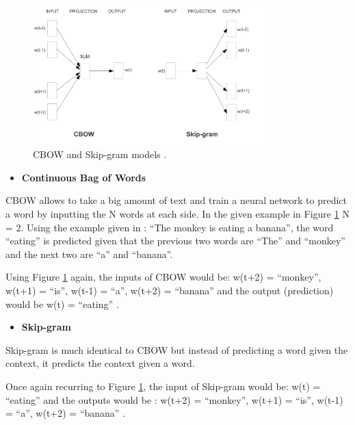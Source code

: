         \begin{figure}[H]
            \centering
            \captionsetup{justification=centering}
            \includegraphics[width=0.8\textwidth]{Sections/3StateOfTheArt/3_images/Cbow_Skip.png}
            \caption[CBOW and Skip-gram models]{CBOW and Skip-gram models \cite{Mikolov2013}.} 
            \label{fig:cbow_skip}
        \end{figure}



        \begin{itemize}
            \item \textbf{Continuous Bag of Words}
        \end{itemize}


       CBOW allows to take a big amount of text and train a neural network to predict a word by inputting the N words at each side. In the given example in Figure \ref{fig:cbow_skip}  N = 2. Using the example given in \cite{Mordecki2017} : “The monkey is eating a banana”, the word “eating” is predicted given that the previous two words are “The” and “monkey” and the next two are “a” and “banana”.

        Using Figure \ref{fig:cbow_skip} again, the inputs of CBOW would be: w(t+2) = “monkey”, w(t+1) = “is”, w(t-1) = “a”, w(t+2) = “banana” and the output (prediction) would be w(t) = “eating” \cite{Mordecki2017}.
        
        
        \begin{itemize}
            \item \textbf{Skip-gram}
        \end{itemize}

        Skip-gram is much identical to CBOW but instead of predicting a word given the context, it predicts the context given a word. 

        Once again recurring to Figure \ref{fig:cbow_skip}, the input of Skip-gram would be: w(t) = “eating” and the outputs would be : w(t+2) = “monkey”, w(t+1) = “is”, w(t-1) = “a”, w(t+2) = “banana” \cite{Mordecki2017}.


